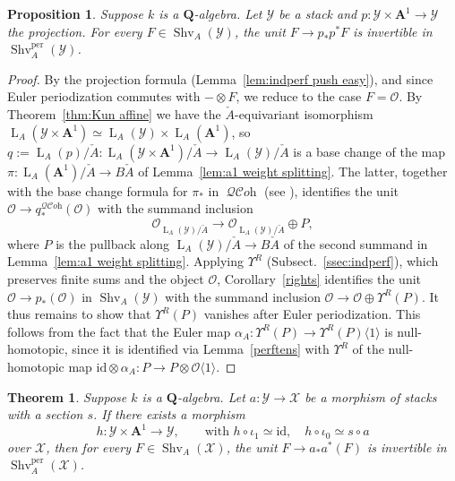 \documentclass[12pt, oneside]{amsart}
\numberwithin{equation}{section}
\newtheorem{theorem}[subsubsection]{Theorem}
\newtheorem{proposition}[subsubsection]{Proposition}
\theoremstyle{remark}
\theoremstyle{plain}
\DeclareMathOperator{\QCOH}{\mathcal{QC}\textit{oh}}
\newcommand{\Loop}{\operatorname{L}}
\newcommand{\OO}{\mathcal{O}}
\newcommand{\YY}{\mathcal{Y}}
\newcommand{\XX}{\mathcal{X}}
\newcommand{\Ren}{\Upsilon}
\newcommand{\id}{\mathrm{id}}
\newcommand{\aff}{\mathbf{A}^1}
\newcommand{\Thom}[1]{\langle #1 \rangle}
\newcommand{\Shv}{\operatorname{Shv}}
\newcommand{\Shvper}{\operatorname{Shv}^{\mathrm{per}}}
\begin{document}
\begin{proposition}\label{prop:a1 invariance shv}
Suppose $k$ is a $\mathbf{Q}$-algebra.
Let $\YY$ be a stack and $p : \YY \times \aff \to \YY$ the projection.
For every $F \in \Shv_A(\YY)$, the unit $F \to p_* p^* F$ is invertible in $\Shvper_A(\YY)$.
\end{proposition}
\begin{proof}
By the projection formula (Lemma~\ref{lem:indperf push easy}), and since Euler periodization commutes with $-\otimes F$, we reduce to the case $F=\OO$.
By Theorem~\ref{thm:Kun affine} we have the $\check{A}$-equivariant isomorphism $\Loop_A(\YY \times \aff) \simeq \Loop_A(\YY) \times \Loop_A(\aff)$, so $q := \Loop_A(p)/\check{A} : \Loop_A(\YY \times \aff)/\check{A} \to \Loop_A(\YY)/\check{A}$ is a base change of the map $\pi : \Loop_A(\aff)/\check{A} \to B\check{A}$ of Lemma~\ref{lem:a1 weight splitting}.
The latter, together with the base change formula for $\pi_*$ in $\QCOH$ (see \cite[Prop.~6.3.4.1]{SAG}), identifies the unit $\OO \to q^{\QCOH}_*(\OO)$ with the summand inclusion
\[
   \OO_{\Loop_A(\YY)/\check{A}} \longrightarrow \OO_{\Loop_A(\YY)/\check{A}} \oplus P,
\]
where $P$ is the pullback along $\Loop_A(\YY)/\check{A} \to B\check{A}$ of the second summand in Lemma~\ref{lem:a1 weight splitting}.
Applying $\Ren^R$ (Subsect.~\ref{ssec:indperf}), which preserves finite sums and the object $\OO$, Corollary~\ref{rights} identifies the unit $\OO \to p_*(\OO)$ in $\Shv_A(\YY)$ with the summand inclusion $\OO \to \OO \oplus \Ren^R(P)$.
It thus remains to show that $\Ren^R(P)$ vanishes after Euler periodization.
This follows from the fact that the Euler map $\alpha_A : \Ren^R(P) \to \Ren^R(P)\Thom{1}$ is null-homotopic, since it is identified via Lemma~\ref{perftens} with $\Ren^R$ of the null-homotopic map $\id \otimes \alpha_A : P \to P \otimes \OO\Thom{1}$.
\end{proof}

\begin{theorem}\label{thm:homotopy invariance shv}
Suppose $k$ is a $\mathbf{Q}$-algebra.
Let $a : \YY \to \XX$ be a morphism of stacks with a section $s$.
If there exists a morphism
\[
  h : \YY \times \aff \to \YY,
  \qquad \text{with } h \circ \iota_1 \simeq \id,
  \quad h \circ \iota_0 \simeq s \circ a
\]
over $\XX$, then for every $F \in \Shv_A(\XX)$, the unit $F \to a_*a^*(F)$ is invertible in $\Shvper_A(\XX)$.
\end{theorem}
\end{document}

